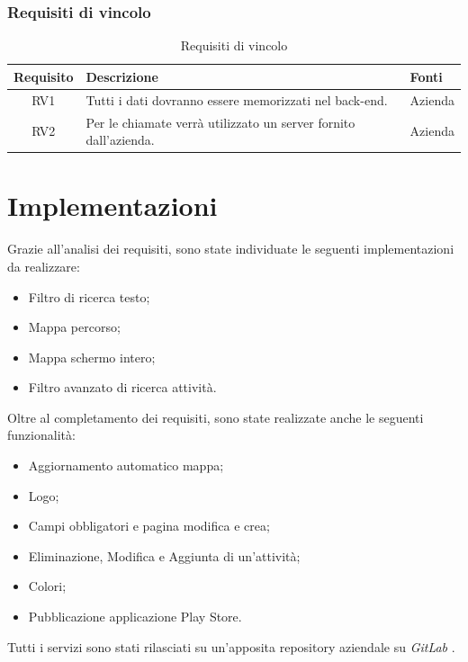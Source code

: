 \subsubsection{Requisiti di vincolo}

\begin{center}
	\begin{table}[h!]
		
		\label{tab:Requisiti di vincolo}
		\begin{tabularx}{\textwidth}{|c|p{8cm}|p{2.1cm}|}
			
			\hline
			\textbf{Requisito} & \centering\textbf{Descrizione} & \textbf{Fonti}  \\\hline
			
				RV1 & Tutti i dati dovranno essere memorizzati nel back-end.  & Azienda\\
				\hline
				RV2 & Per le chiamate verrà utilizzato un server fornito dall'azienda.  & Azienda\\
			\hline		
		\end{tabularx}
		\vspace{0.3cm}
		\caption{Requisiti di vincolo}
	\end{table}
\end{center}


\newpage

\section{Implementazioni}
Grazie all'analisi dei requisiti, sono state individuate le seguenti implementazioni da realizzare:
\begin{itemize}
	\item Filtro di ricerca testo;
	\item Mappa percorso;
	\item Mappa schermo intero;
	\item Filtro avanzato di ricerca attività.
\end{itemize}
Oltre al completamento dei requisiti, sono state realizzate anche le seguenti funzionalità: 
\begin{itemize}
	\item Aggiornamento automatico mappa;
	\item Logo;
	\item Campi obbligatori e pagina modifica e crea;
	\item Eliminazione, Modifica e Aggiunta di un'attività;
	\item Colori;
	\item Pubblicazione applicazione Play Store.
\end{itemize}
Tutti i servizi sono stati rilasciati su un'apposita repository aziendale su \textit{GitLab} \cite{repo}.

